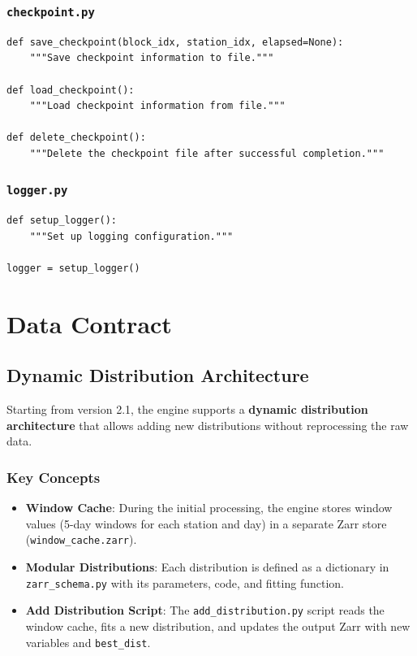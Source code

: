 ﻿\documentclass[12pt,a4paper]{report}
\begin{document}
\subsection{\texttt{checkpoint.py}}
\begin{lstlisting}[caption=checkpoint.py]
def save_checkpoint(block_idx, station_idx, elapsed=None):
    """Save checkpoint information to file."""
    
def load_checkpoint():
    """Load checkpoint information from file."""
    
def delete_checkpoint():
    """Delete the checkpoint file after successful completion."""
\end{lstlisting}

\subsection{\texttt{logger.py}}
\begin{lstlisting}[caption=logger.py]
def setup_logger():
    """Set up logging configuration."""
    
logger = setup_logger()
\end{lstlisting}

\chapter{Data Contract}
\section{Dynamic Distribution Architecture}
Starting from version 2.1, the engine supports a \textbf{dynamic distribution architecture} that allows adding new distributions without reprocessing the raw data.

\subsection{Key Concepts}
\begin{itemize}
    \item \textbf{Window Cache}: During the initial processing, the engine stores window values (5-day windows for each station and day) in a separate Zarr store (\texttt{window\_cache.zarr}).
    \item \textbf{Modular Distributions}: Each distribution is defined as a dictionary in \texttt{zarr\_schema.py} with its parameters, code, and fitting function.
    \item \textbf{Add Distribution Script}: The \texttt{add\_distribution.py} script reads the window cache, fits a new distribution, and updates the output Zarr with new variables and \texttt{best\_dist}.
\end{itemize}
\end{document}
